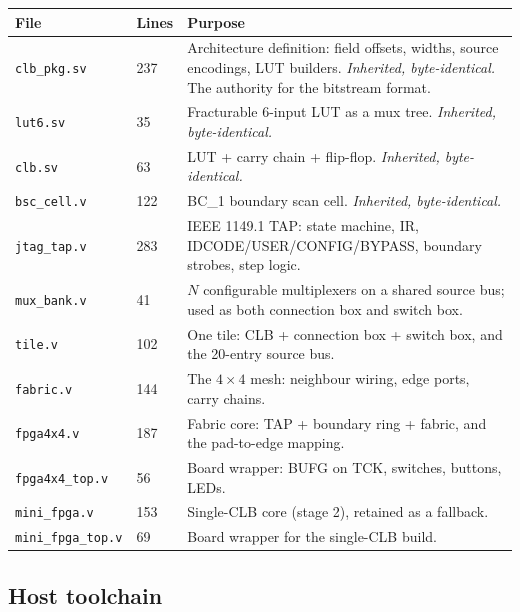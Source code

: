 \documentclass[11pt,a4paper]{article}
\newcommand{\file}[1]{\texttt{#1}}
\begin{document}
\begin{longtable}{llp{72mm}}
\toprule
\textbf{File} & \textbf{Lines} & \textbf{Purpose} \\
\midrule
\endhead
\file{clb\_pkg.sv}     & 237 & Architecture definition: field offsets, widths, source encodings, LUT builders. \emph{Inherited, byte-identical.} The authority for the bitstream format. \\
\file{lut6.sv}         & 35  & Fracturable 6-input LUT as a mux tree. \emph{Inherited, byte-identical.} \\
\file{clb.sv}          & 63  & LUT + carry chain + flip-flop. \emph{Inherited, byte-identical.} \\
\file{bsc\_cell.v}     & 122 & BC\_1 boundary scan cell. \emph{Inherited, byte-identical.} \\
\file{jtag\_tap.v}     & 283 & IEEE 1149.1 TAP: state machine, IR, IDCODE/USER/CONFIG/BYPASS, boundary strobes, step logic. \\
\file{mux\_bank.v}     & 41  & $N$ configurable multiplexers on a shared source bus; used as both connection box and switch box. \\
\file{tile.v}          & 102 & One tile: CLB + connection box + switch box, and the 20-entry source bus. \\
\file{fabric.v}        & 144 & The $4\times4$ mesh: neighbour wiring, edge ports, carry chains. \\
\file{fpga4x4.v}       & 187 & Fabric core: TAP + boundary ring + fabric, and the pad-to-edge mapping. \\
\file{fpga4x4\_top.v}  & 56  & Board wrapper: BUFG on TCK, switches, buttons, LEDs. \\
\file{mini\_fpga.v}    & 153 & Single-CLB core (stage 2), retained as a fallback. \\
\file{mini\_fpga\_top.v}& 69 & Board wrapper for the single-CLB build. \\
\bottomrule
\end{longtable}

\subsection{Host toolchain}
\end{document}
